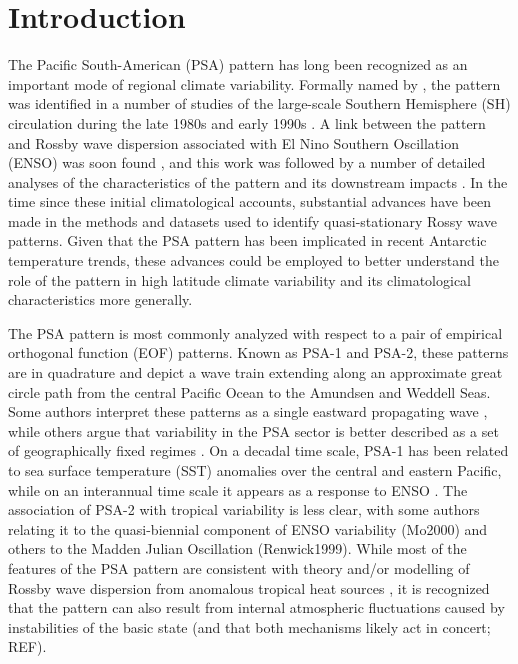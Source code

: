 \section{Introduction}

The Pacific South-American (PSA) pattern has long been recognized as an important mode of regional climate variability. Formally named by \cite{Mo1987}, the pattern was identified in a number of studies of the large-scale Southern Hemisphere (SH) circulation during the late 1980s and early 1990s \citep[e.g.][]{Lau1994}. A link between the pattern and Rossby wave dispersion associated with El Nino Southern Oscillation (ENSO) was soon found \citep[e.g.][]{Karoly1989}, and this work was followed by a number of detailed analyses of the characteristics of the pattern and its downstream impacts \citep[e.g.][]{Mo1998,Mo2000,Mo2001}. In the time since these initial climatological accounts, substantial advances have been made in the methods and datasets used to identify quasi-stationary Rossy wave patterns. Given that the PSA pattern has been implicated in recent Antarctic temperature trends, these advances could be employed to better understand the role of the pattern in high latitude climate variability and its climatological characteristics more generally.

The PSA pattern is most commonly analyzed with respect to a pair of empirical orthogonal function (EOF) patterns. Known as PSA-1 and PSA-2, these patterns are in quadrature and depict a wave train extending along an approximate great circle path from the central Pacific Ocean to the Amundsen and Weddell Seas. Some authors interpret these patterns as a single eastward propagating wave \citep{Mo1998}, while others argue that variability in the PSA sector is better described as a set of geographically fixed regimes \citep{Robertson2003}. On a decadal time scale, PSA-1 has been related to sea surface temperature (SST) anomalies over the central and eastern Pacific, while on an interannual time scale it appears as a response to ENSO \citep{Mo2001}. The association of PSA-2 with tropical variability is less clear, with some authors relating it to the quasi-biennial component of ENSO variability (Mo2000) and others to the Madden Julian Oscillation (Renwick1999). While most of the features of the PSA pattern are consistent with theory and/or modelling of Rossby wave dispersion from anomalous tropical heat sources \citep[e.g.][]{Liu2007,Li2015}, it is recognized that the pattern can also result from internal atmospheric fluctuations caused by instabilities of the basic state (and that both mechanisms likely act in concert; REF).

